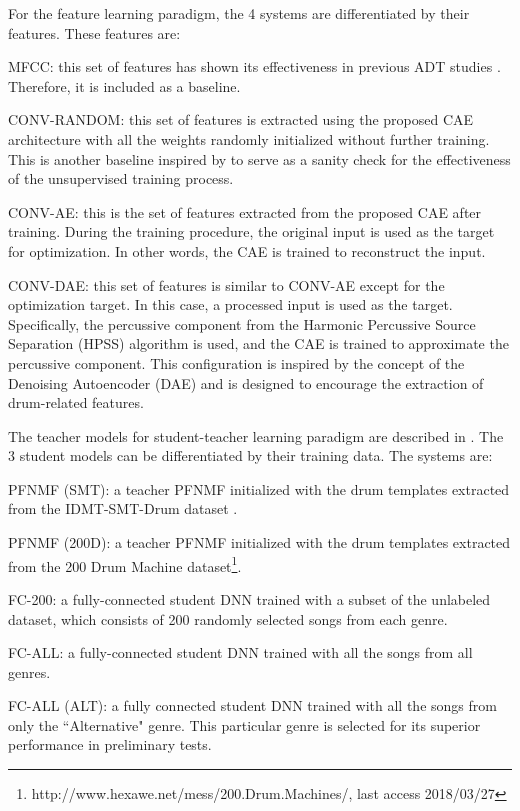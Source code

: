 \documentclass{article}
\begin{document}
For the feature learning paradigm, the 4 systems are differentiated by their features. These features are: 
\begin{compactenum}[(i)]
\item MFCC: this set of features has shown its effectiveness in previous ADT studies \cite{PaulusK09_DrumTransHMM_JASMP, Thompson2014, SouzaBN15_CymbalClassi_IJCNN}. Therefore, it is included as a baseline.   
\item CONV-RANDOM: this set of features is extracted using the proposed CAE architecture with all the weights randomly initialized without further training. This is another baseline inspired by \cite{Choi2017a} to serve as a sanity check for the effectiveness of the unsupervised training process.  
\item CONV-AE: this is the set of features extracted from the proposed CAE after training. During the training procedure, the original input is used as the target for optimization. In other words, the CAE is trained to reconstruct the input. 
\item CONV-DAE: this set of features is similar to CONV-AE except for the optimization target. In this case, a processed input is used as the target. Specifically, the percussive component from the Harmonic Percussive Source Separation (HPSS) \cite{Fitzgerald2010} algorithm is used, and the CAE is trained to approximate the percussive component. This configuration is inspired by the concept of the Denoising Autoencoder (DAE) \cite{Vincent2008} and is designed to encourage the extraction of drum-related features.\\ 
\end{compactenum}

The teacher models for student-teacher learning paradigm are described in \cite{Wu2017}. The 3 student models can be differentiated by their training data. The systems are: 
\begin{compactenum}[(i)]
\item PFNMF (SMT): a teacher PFNMF initialized with the drum templates extracted from the IDMT-SMT-Drum dataset \cite{DittmarG14_DrumTranscription_DAFX}.
\item PFNMF (200D): a teacher PFNMF initialized with the drum templates extracted from the 200 Drum Machine dataset\footnote{http://www.hexawe.net/mess/200.Drum.Machines/, last access 2018/03/27}.
\item FC-200: a fully-connected student DNN trained with a subset of the unlabeled dataset, which consists of 200 randomly selected songs from each genre. 
\item FC-ALL: a fully-connected student DNN trained with all the songs from all genres.
\item FC-ALL (ALT): a fully connected student DNN trained with all the songs from only the ``Alternative" genre. This particular genre is selected for its superior performance in preliminary tests. \\
\end{compactenum}
\end{document}
